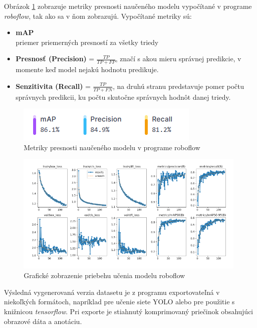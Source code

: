     Obrázok \ref{fig:roboflow_metrics} zobrazuje metriky presnosti naučeného modelu vypočítané v programe \emph{roboflow}, tak ako sa v ňom zobrazujú. Vypočítané metriky sú:

    \begin{itemize}
        \item \textbf{\ac{mAP}} \\ priemer priemerných presností za všetky triedy
        \item \textbf{Presnosť (Precision)} = \(\frac{TP}{TP + FP}\), značí s akou mieru správnej predikcie, v momente keď model nejakú hodnotu predikuje.
        \item \textbf{Senzitivita (Recall)} = \(\frac{TP}{TP + FN}\), na druhú stranu predstavuje pomer počtu správnych predikcii, ku počtu skutočne správnych hodnôt danej triedy.
    \end{itemize}

    \begin{figure}[H]
        \centering
        \includegraphics[width=.35\textwidth]{obrazky/roboflow/metrics.png}
        \caption{Metriky presnosti naučeného modelu v programe roboflow}
        \label{fig:roboflow_metrics}
    \end{figure}

    \begin{figure}[H]
        \centering
        \includegraphics[width=.8\textwidth]{obrazky/roboflow/train.png}
        \caption{Grafické zobrazenie priebehu učenia modelu roboflow}
    \end{figure}

    Výsledná vygenerovaná verzia datasetu je z programu exportovateľná v niekoľkých formátoch, napríklad pre učenie siete \ac{YOLO} alebo pre použitie s knižnicou \emph{tensorflow}. Pri exporte je stiahnutý komprimovaný priečinok obsahujúci obrazové dáta a anotáciu.


